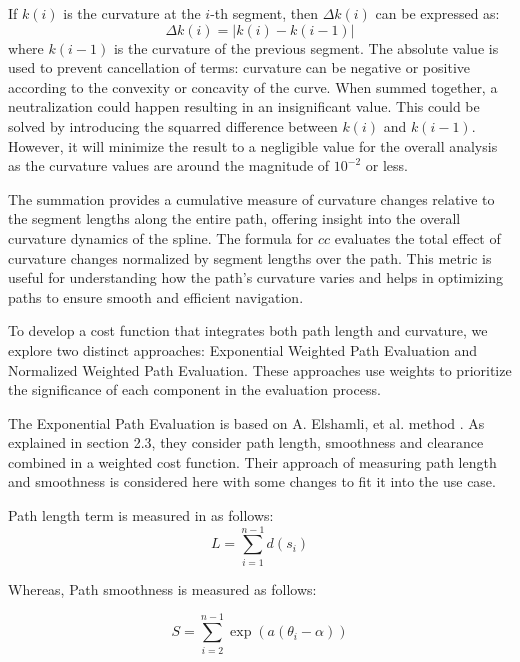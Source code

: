 If \(k(i)\) is the curvature at the \(i\)-th segment, then \( \Delta k(i) \) can be expressed as:
\begin{equation}
    \Delta k(i) = \left| k(i) - k(i-1) \right|
\end{equation}
where \(k(i-1)\) is the curvature of the previous segment. The absolute value is used to prevent cancellation of terms:
curvature can be negative or positive according to the convexity or concavity of the curve. When summed together,
a neutralization could happen resulting in an insignificant value. This could be solved by introducing the squarred 
difference between \(k(i)\) and \(k(i-1)\). However, it will minimize the result to a negligible value for the 
overall analysis as the curvature values are around the magnitude of \(10^{-2}\) or less.

The summation provides a cumulative measure of curvature changes relative to the segment lengths along the entire path, 
offering insight into the overall curvature dynamics of the spline. The formula for \(cc\) evaluates the total effect 
of curvature changes normalized by segment lengths over 
the path. This metric is useful for understanding how the path’s curvature varies and helps in optimizing paths 
to ensure smooth and efficient navigation.

To develop a cost function that integrates both path length and curvature, we explore two distinct approaches: 
Exponential Weighted Path Evaluation and Normalized Weighted Path Evaluation. These approaches use weights to 
prioritize the significance of each component in the evaluation process. 

The Exponential Path Evaluation is based on A. Elshamli, et al. method \cite{R17}. As explained in section 2.3,
they consider path length, smoothness and clearance combined in a weighted cost function.
Their approach of measuring path length and smoothness is considered here with some changes to fit it into the use case.

Path length term is measured in \cite{R17} as follows:
\begin{equation}
L = \sum_{i=1}^{n-1} d(s_i)
\end{equation}

Whereas, Path smoothness is measured as follows:

\begin{equation}
S = \sum_{i=2}^{n-1} \exp(a(\theta_i - \alpha))
\end{equation}

